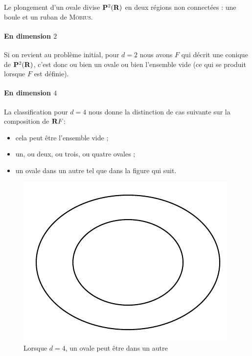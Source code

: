 \documentclass{livre}
\begin{document}
Le plongement d'un ovale divise $\mathbf{P}^{2}(\mathbf{R})$ en deux régions non connectées : une boule et un ruban de \textsc{Möbius}.

\paragraph{En dimension $2$}Si on revient au problème initial, pour $d=2$ nous avons $F$ qui décrit une conique de $\mathbf{P}^{2}(\mathbf{R})$, c'est donc ou bien un ovale ou bien l'ensemble vide (ce qui se produit lorsque $F$ est définie).


\paragraph{En dimension $4$}La classification pour $d=4$ nous donne la distinction de cas suivante sur la composition de $\mathbf{R} F$:
\begin{itemize}
\item cela peut être l'ensemble vide ;
\item un, ou deux, ou trois, ou quatre ovales ;
\item un ovale dans un autre tel que dans la figure qui suit.
\end{itemize}

\begin{figure}[H]
\begin{center}
\includegraphics[scale=0.6]{Figures/fig1}
\end{center}
\caption{Lorsque $d=4$, un ovale peut être dans un autre}\label{fig1}
\end{figure}
\end{document}
